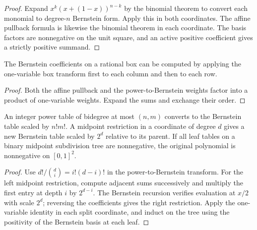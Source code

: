 \begin{proof}
\leanok
Expand $x^k(x+(1-x))^{n-k}$ by the binomial theorem to convert each monomial
to degree-$n$ Bernstein form. Apply this in both coordinates. The affine
pullback formula is likewise the binomial theorem in each coordinate.
The basis factors are nonnegative on the unit square, and an active positive
coefficient gives a strictly positive summand.
\end{proof}

\begin{lemma}
\label{lem:bernstein-separable}
\leanok
The Bernstein coefficients on a rational box can be computed by applying the
one-variable box transform first to each column and then to each row.
\end{lemma}

\begin{proof}
\leanok
Both the affine pullback and the power-to-Bernstein weights factor into a
product of one-variable weights. Expand the sums and exchange their order.
\end{proof}

\begin{lemma}
\label{lem:bernstein-midpoint}
\leanok
An integer power table of bidegree at most $(n,m)$ converts to the
Bernstein table scaled by $n!m!$. A midpoint restriction in a coordinate
of degree $d$ gives a new Bernstein table scaled by $2^d$ relative to
its parent. If all leaf tables on a binary midpoint subdivision tree
are nonnegative, the original polynomial is nonnegative on $[0,1]^2$.
\end{lemma}

\begin{proof}
\leanok
Use $d!/{d\choose i}=i!(d-i)!$ in the power-to-Bernstein transform.
For the left midpoint restriction, compute adjacent sums successively
and multiply the first entry at depth $i$ by $2^{d-i}$.
The Bernstein recursion verifies evaluation at $x/2$ with scale $2^d$;
reversing the coefficients gives the right restriction.
Apply the one-variable identity in each split coordinate, and induct on
the tree using the positivity of the Bernstein basis at each leaf.
\end{proof}


